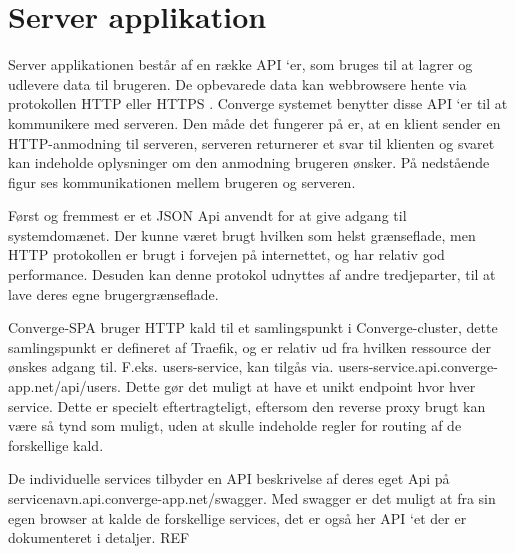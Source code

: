 \section{Server applikation}

Server applikationen består af en række API ‘er, som bruges til at lagrer og udlevere data til brugeren. De opbevarede data kan webbrowsere hente via protokollen HTTP eller HTTPS \cite[HTTP]{converge-terms} . Converge systemet benytter disse API ‘er til at kommunikere med serveren. Den måde det fungerer på er, at en klient sender en HTTP-anmodning til serveren, serveren returnerer et svar til klienten og svaret kan indeholde oplysninger om den anmodning brugeren ønsker. På nedstående figur ses kommunikationen mellem brugeren og serveren.


Først og fremmest er et JSON Api anvendt for at give adgang til systemdomænet. Der kunne været brugt hvilken som helst grænseflade, men HTTP protokollen er brugt i forvejen på internettet, og har relativ god performance. Desuden kan denne protokol udnyttes af andre tredjeparter, til at lave deres egne brugergrænseflade.

Converge-SPA bruger HTTP kald til et samlingspunkt i Converge-cluster, dette samlingspunkt er defineret af Traefik, og er relativ ud fra hvilken ressource der ønskes adgang til. F.eks. users-service, kan tilgås via. users-service.api.converge-app.net/api/users. Dette gør det muligt at have et unikt endpoint hvor hver service. Dette er specielt eftertragteligt, eftersom den reverse proxy brugt kan være så tynd som muligt, uden at skulle indeholde regler for routing af de forskellige kald.

De individuelle services tilbyder en API beskrivelse af deres eget Api på servicenavn.api.converge-app.net/swagger. Med swagger er det muligt at fra sin egen browser at kalde de forskellige services, det er også her API ‘et der er dokumenteret i detaljer.
REF